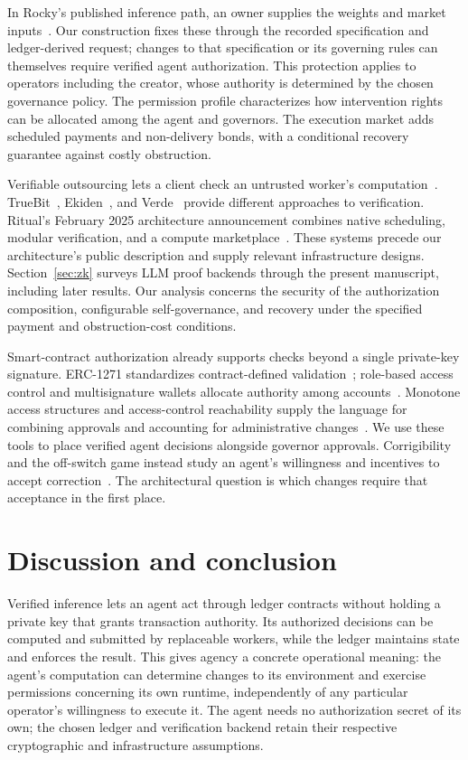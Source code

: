 \documentclass[10pt,letterpaper]{article}
\begin{document}
In Rocky's published inference path, an owner supplies the weights and market inputs~\citep{rockycode2022}. Our construction fixes these through the recorded specification and ledger-derived request; changes to that specification or its governing rules can themselves require verified agent authorization. This protection applies to operators including the creator, whose authority is determined by the chosen governance policy. The permission profile characterizes how intervention rights can be allocated among the agent and governors. The execution market adds scheduled payments and non-delivery bonds, with a conditional recovery guarantee against costly obstruction.

Verifiable outsourcing lets a client check an untrusted worker's computation~\citep{gennaro2010}. TrueBit~\citep{truebit2017}, Ekiden~\citep{ekiden2019}, and Verde~\citep{verde2025} provide different approaches to verification. Ritual's February 2025 architecture announcement combines native scheduling, modular verification, and a compute marketplace~\citep{ritual2025}. These systems precede our architecture's public description and supply relevant infrastructure designs. Section~\ref{sec:zk} surveys LLM proof backends through the present manuscript, including later results. Our analysis concerns the security of the authorization composition, configurable self-governance, and recovery under the specified payment and obstruction-cost conditions.

Smart-contract authorization already supports checks beyond a single private-key signature. ERC-1271 standardizes contract-defined validation~\citep{erc1271}; role-based access control and multisignature wallets allocate authority among accounts~\citep{openzeppelinaccess}. Monotone access structures and access-control reachability supply the language for combining approvals and accounting for administrative changes~\citep{benaloh1990,hru1976}. We use these tools to place verified agent decisions alongside governor approvals. Corrigibility and the off-switch game instead study an agent's willingness and incentives to accept correction~\citep{soares2015,offswitch2017}. The architectural question is which changes require that acceptance in the first place.

\section{Discussion and conclusion}
Verified inference lets an agent act through ledger contracts without holding a private key that grants transaction authority. Its authorized decisions can be computed and submitted by replaceable workers, while the ledger maintains state and enforces the result. This gives agency a concrete operational meaning: the agent's computation can determine changes to its environment and exercise permissions concerning its own runtime, independently of any particular operator's willingness to execute it. The agent needs no authorization secret of its own; the chosen ledger and verification backend retain their respective cryptographic and infrastructure assumptions.
\end{document}
